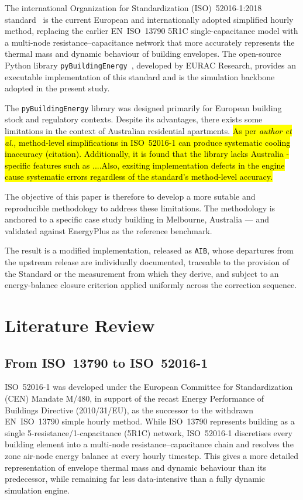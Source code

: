 \documentclass[12pt, a4paper]{article}
\begin{document}
The international Organization for Standardization (ISO)~52016-1:2018 standard~\cite{iso52016} is the current European and
internationally adopted simplified hourly method, replacing the earlier EN~ISO~13790
5R1C single-capacitance model with a multi-node resistance--capacitance network that
more accurately represents the thermal mass and dynamic behaviour of building
envelopes.
The open-source Python library \texttt{pyBuildingEnergy}~\cite{eurac2024},
developed by EURAC Research, provides an executable implementation of this standard
and is the simulation backbone adopted in the present study.
 
The \texttt{pyBuildingEnergy} library was designed primarily for
European building stock and regulatory contexts.  Despite its advantages, there exists some limitations in the context of Australian
residential apartments. \hl{As per \textit{author et al.,} method-level simplifications in ISO~52016-1 can produce systematic cooling inaccuracy (citation). Additionally, it is found that the library 
lacks Australia -specific features such as ....Also, exsiting implementation defects in the engine cause
systematic errors regardless of the standard's method-level accuracy.}
 
The objective of this paper is therefore to develop a more sutable and reproducible methodology to address these limitations.
The methodology is anchored to a specific case study building in Melbourne, Australia — and validated against EnergyPlus as the reference benchmark.

The result is a modified implementation, released as \texttt{AIB}, whose
departures from the upstream release are individually documented, traceable to
the provision of the Standard or the measurement from which they derive, and
subject to an energy-balance closure criterion applied uniformly across the
correction sequence.
 
\section{Literature Review}
\subsection{From ISO~13790 to ISO~52016-1}
ISO~52016-1 was developed under the European Committee for Standardization (CEN) Mandate M/480, in support of the recast Energy
Performance of Buildings Directive (2010/31/EU), as the successor to the withdrawn
EN~ISO~13790 simple hourly method.
While ISO~13790 represents building as a single 5-resistance/1-capacitance (5R1C)
network, ISO~52016-1 discretises every building element into a multi-node
resistance--capacitance chain and resolves the zone air-node energy balance at every
hourly timestep.
This gives a more detailed representation of envelope thermal mass and dynamic
behaviour than its predecessor, while remaining far less data-intensive than a
fully dynamic simulation engine.
 
\end{document}
